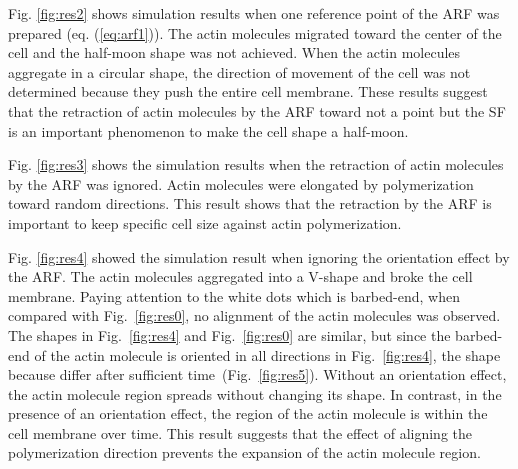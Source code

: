 \documentclass[a4paper,12pt, oneside]{book}
\begin{document}
Fig. \ref{fig:res2} shows simulation results when one reference point of the ARF was prepared (eq. (\ref{eq:arf1})).
The actin molecules migrated toward the center of the cell and the half-moon shape was not achieved.
When the actin molecules aggregate in a circular shape, the direction of movement of the cell was not determined because they push the entire cell membrane.
These results suggest that the retraction of actin molecules by the ARF toward not a point but the SF is an important phenomenon to make the cell shape a half-moon.

Fig. \ref{fig:res3} shows the simulation results when the retraction of actin molecules by the ARF was ignored.
Actin molecules were elongated by  polymerization toward  random directions.
This result shows that the retraction by the ARF is important to keep specific cell size against actin polymerization.

Fig. \ref{fig:res4} showed the simulation result when ignoring the orientation effect by the ARF.
The actin molecules aggregated into a V-shape and broke the cell membrane.
Paying attention to the white dots which is barbed-end, when compared with Fig.~\ref{fig:res0}, no alignment of the actin molecules was observed.
The shapes in Fig.~\ref{fig:res4} and Fig.~\ref{fig:res0} are similar, but since the barbed-end of the actin molecule is oriented in all directions in Fig.~\ref{fig:res4}, the shape because differ after sufficient time~(Fig.~\ref{fig:res5}). 
Without an orientation effect, the actin molecule region spreads without changing its shape.
In contrast, in the presence of an orientation effect, the region of the actin molecule is within the cell membrane over time.
This result suggests that the effect of aligning the polymerization direction prevents the expansion of the actin molecule region.
\end{document}

